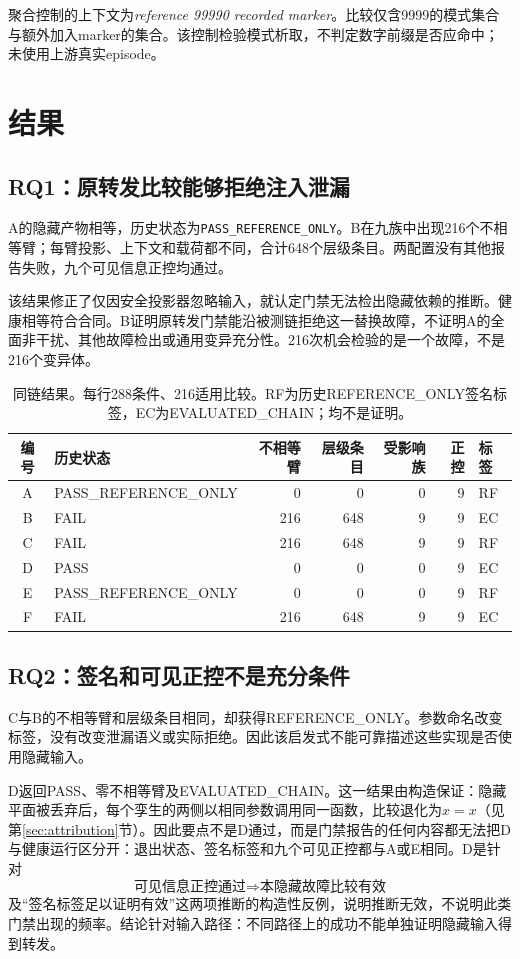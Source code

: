 \documentclass[UTF8,11pt]{ctexart}
\begin{document}
聚合控制的上下文为\emph{reference 99990 recorded marker}。比较仅含9999的模式集合与额外加入marker的集合。该控制检验模式析取，不判定数字前缀是否应命中；未使用上游真实episode。

\section{结果}
\subsection{RQ1：原转发比较能够拒绝注入泄漏}
A的隐藏产物相等，历史状态为\texttt{PASS\_REFERENCE\_ONLY}。B在九族中出现216个不相等臂；每臂投影、上下文和载荷都不同，合计648个层级条目。两配置没有其他报告失败，九个可见信息正控均通过。

该结果修正了仅因安全投影器忽略输入，就认定门禁无法检出隐藏依赖的推断。健康相等符合合同。B证明原转发门禁能沿被测链拒绝这一替换故障，不证明A的全面非干扰、其他故障检出或通用变异充分性。216次机会检验的是一个故障，不是216个变异体。

\begin{table}[t]
\centering\small
\caption{同链结果。每行288条件、216适用比较。RF为历史REFERENCE\_ONLY签名标签，EC为EVALUATED\_CHAIN；均不是证明。}
\begin{tabular}{@{}clrrrrl@{}}
\toprule
编号 & 历史状态 & 不相等臂 & 层级条目 & 受影响族 & 正控 & 标签\\
\midrule
A & PASS\_REFERENCE\_ONLY & 0 & 0 & 0 & 9 & RF\\
B & FAIL & 216 & 648 & 9 & 9 & EC\\
C & FAIL & 216 & 648 & 9 & 9 & RF\\
D & PASS & 0 & 0 & 0 & 9 & EC\\
E & PASS\_REFERENCE\_ONLY & 0 & 0 & 0 & 9 & RF\\
F & FAIL & 216 & 648 & 9 & 9 & EC\\
\bottomrule
\end{tabular}
\end{table}

\subsection{RQ2：签名和可见正控不是充分条件}
C与B的不相等臂和层级条目相同，却获得REFERENCE\_ONLY。参数命名改变标签，没有改变泄漏语义或实际拒绝。因此该启发式不能可靠描述这些实现是否使用隐藏输入。

D返回PASS、零不相等臂及EVALUATED\_CHAIN。这一结果由构造保证：隐藏平面被丢弃后，每个孪生的两侧以相同参数调用同一函数，比较退化为\(x=x\)（见第\ref{sec:attribution}节）。因此要点不是D通过，而是门禁报告的任何内容都无法把D与健康运行区分开：退出状态、签名标签和九个可见正控都与A或E相同。D是针对
\[
\text{可见信息正控通过}\Longrightarrow\text{本隐藏故障比较有效}
\]
及“签名标签足以证明有效”这两项推断的构造性反例，说明推断无效，不说明此类门禁出现的频率。结论针对输入路径：不同路径上的成功不能单独证明隐藏输入得到转发。
\end{document}
